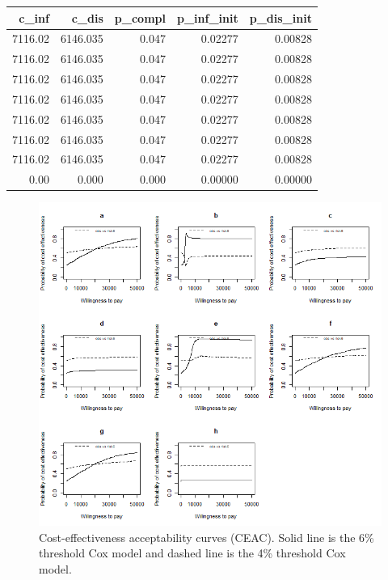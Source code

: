 \documentclass[
]{article}
\begin{document}
\begin{longtable}[]{@{}rrrrr@{}}
\toprule
c\_inf & c\_dis & p\_compl & p\_inf\_init & p\_dis\_init \\
\midrule
\endhead
7116.02 & 6146.035 & 0.047 & 0.02277 & 0.00828 \\
7116.02 & 6146.035 & 0.047 & 0.02277 & 0.00828 \\
7116.02 & 6146.035 & 0.047 & 0.02277 & 0.00828 \\
7116.02 & 6146.035 & 0.047 & 0.02277 & 0.00828 \\
7116.02 & 6146.035 & 0.047 & 0.02277 & 0.00828 \\
7116.02 & 6146.035 & 0.047 & 0.02277 & 0.00828 \\
7116.02 & 6146.035 & 0.047 & 0.02277 & 0.00828 \\
0.00 & 0.000 & 0.000 & 0.00000 & 0.00000 \\
\bottomrule
\end{longtable}

\begin{figure}

{\centering \includegraphics[width=0.6\linewidth]{../../images/ceac_grid} 

}

\caption{Cost-effectiveness acceptability curves (CEAC). Solid line is the 6\% threshold Cox model and dashed line is the 4\% threshold Cox model.}\label{fig:ceac}
\end{figure}
\end{document}
